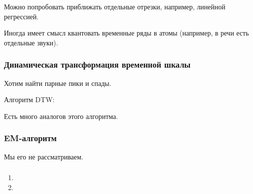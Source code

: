 \documentclass[main.tex]{subfiles}
\begin{document}
Можно попробовать приближать отдельные отрезки, например, линейной регрессией.

Иногда имеет смысл квантовать временные ряды в атомы (например, в речи есть отдельные звуки).

\subsubsection{Динамическая трансформация временной шкалы}

Хотим найти парные пики и спады.

Алгоритм DTW:


Есть много аналогов этого алгоритма.

\subsubsection{EM-алгоритм}

Мы его не рассматриваем.

\subsubsection{}

\begin{enumerate}[noitemsep]
    \item
    \item
\end{enumerate}
\end{document}
